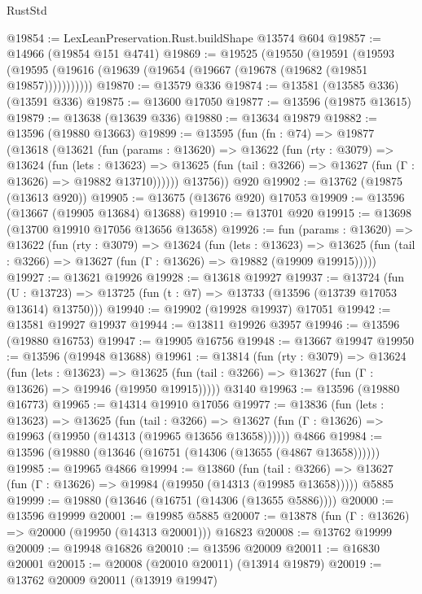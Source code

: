 \begin{lexlean}{RustStd}
\begin{coremodule}
@19854 := LexLeanPreservation.Rust.buildShape @13574 @604
@19857 := @14966 (@19854 @151 @4741)
@19869 := @19525
    (@19550
      (@19591
        (@19593 (@19595 (@19616 (@19639 (@19654 (@19667 (@19678 (@19682 (@19851 @19857)))))))))))
@19870 := @13579 @336
@19874 := @13581 (@13585 @336) (@13591 @336)
@19875 := @13600 @17050
@19877 := @13596 (@19875 @13615)
@19879 := @13638 (@13639 @336)
@19880 := @13634 @19879
@19882 := @13596 (@19880 @13663)
@19899 := @13595
    (fun (fn : @74) =>
    @19877
      (@13618
        (@13621
          (fun (params : @13620) =>
          @13622
            (fun (rty : @3079) =>
            @13624
              (fun (lets : @13623) =>
              @13625 (fun (tail : @3266) => @13627 (fun (Γ : @13626) => @19882 @13710))))))
        @13756))
    @920
@19902 := @13762 (@19875 (@13613 @920))
@19905 := @13675 (@13676 @920) @17053
@19909 := @13596 (@13667 (@19905 @13684) @13688)
@19910 := @13701 @920
@19915 := @13698 (@13700 @19910 @17056 @13656 @13658)
@19926 := fun (params : @13620) =>
  @13622
    (fun (rty : @3079) =>
    @13624
      (fun (lets : @13623) =>
      @13625 (fun (tail : @3266) => @13627 (fun (Γ : @13626) => @19882 (@19909 @19915)))))
@19927 := @13621 @19926
@19928 := @13618 @19927
@19937 := @13724
    (fun (U : @13723) => @13725 (fun (t : @7) => @13733 (@13596 (@13739 @17053 @13614) @13750)))
@19940 := @19902 (@19928 @19937) @17051
@19942 := @13581 @19927 @19937
@19944 := @13811 @19926 @3957
@19946 := @13596 (@19880 @16753)
@19947 := @19905 @16756
@19948 := @13667 @19947
@19950 := @13596 (@19948 @13688)
@19961 := @13814
    (fun (rty : @3079) =>
    @13624
      (fun (lets : @13623) =>
      @13625 (fun (tail : @3266) => @13627 (fun (Γ : @13626) => @19946 (@19950 @19915)))))
    @3140
@19963 := @13596 (@19880 @16773)
@19965 := @14314 @19910 @17056
@19977 := @13836
    (fun (lets : @13623) =>
    @13625
      (fun (tail : @3266) =>
      @13627 (fun (Γ : @13626) => @19963 (@19950 (@14313 (@19965 @13656 @13658))))))
    @4866
@19984 := @13596 (@19880 (@13646 (@16751 (@14306 (@13655 (@4867 @13658))))))
@19985 := @19965 @4866
@19994 := @13860
    (fun (tail : @3266) => @13627 (fun (Γ : @13626) => @19984 (@19950 (@14313 (@19985 @13658)))))
    @5885
@19999 := @19880 (@13646 (@16751 (@14306 (@13655 @5886))))
@20000 := @13596 @19999
@20001 := @19985 @5885
@20007 := @13878 (fun (Γ : @13626) => @20000 (@19950 (@14313 @20001))) @16823
@20008 := @13762 @19999
@20009 := @19948 @16826
@20010 := @13596 @20009
@20011 := @16830 @20001
@20015 := @20008 (@20010 @20011) (@13914 @19879)
@20019 := @13762 @20009 @20011 (@13919 @19947)

\end{coremodule}
\end{lexlean}
